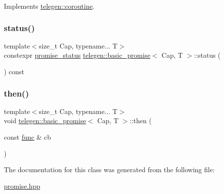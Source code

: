Implements \hyperlink{structtelegen_1_1coroutine_a2a7408a5b9474af3e59128934e3a5c00}{telegen\+::coroutine}.

\mbox{\label{classtelegen_1_1basic__promise_ad792ccef6d5f06386d99f2899ee3fe0e}} 
\subsubsection{\texorpdfstring{status()}{status()}}
{\footnotesize\ttfamily template$<$size\+\_\+t Cap, typename... T$>$ \\
constexpr \hyperlink{namespacetelegen_a51e8b7480c7247182e2c6ca35e2c7504}{promise\+\_\+status} \hyperlink{classtelegen_1_1basic__promise}{telegen\+::basic\+\_\+promise}$<$ Cap, T $>$\+::status (\begin{DoxyParamCaption}{ }\end{DoxyParamCaption}) const\hspace{0.3cm}{\ttfamily [inline]}}

\mbox{\label{classtelegen_1_1basic__promise_a29839b535b83410d8bb03d7629570c02}} 
\subsubsection{\texorpdfstring{then()}{then()}}
{\footnotesize\ttfamily template$<$size\+\_\+t Cap, typename... T$>$ \\
void \hyperlink{classtelegen_1_1basic__promise}{telegen\+::basic\+\_\+promise}$<$ Cap, T $>$\+::then (\begin{DoxyParamCaption}\item[{const \hyperlink{classtelegen_1_1basic__promise_a41bba6927e718eed58a7e6e91db6f6d3}{func} \&}]{cb }\end{DoxyParamCaption})\hspace{0.3cm}{\ttfamily [inline]}}



The documentation for this class was generated from the following file\+:\begin{DoxyCompactItemize}
\item 
\hyperlink{promise_8hpp}{promise.\+hpp}\end{DoxyCompactItemize}
